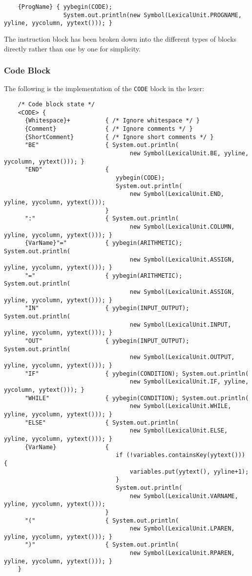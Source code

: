 \documentclass{article}
\begin{document}
	\begin{verbatim}
	{ProgName} { yybegin(CODE);
				 System.out.println(new Symbol(LexicalUnit.PROGNAME, yyline, yycolumn, yytext())); }
	\end{verbatim}

	The instruction block has been broken down into the different types of blocks directly rather than one by one for simplicity.\\

	\subsubsection{Code Block}

	The following is the implementation of the \texttt{CODE} block in the lexer:

	\begin{verbatim}
	/* Code block state */
	<CODE> {
	  {Whitespace}+          { /* Ignore whitespace */ }
	  {Comment}              { /* Ignore comments */ }
	  {ShortComment}         { /* Ignore short comments */ }
	  "BE"                   { System.out.println(
									new Symbol(LexicalUnit.BE, yyline, yycolumn, yytext())); }
	  "END"                  {
								yybegin(CODE);
								System.out.println(
									new Symbol(LexicalUnit.END, yyline, yycolumn, yytext()));
						     }
	  ":"                    { System.out.println(
									new Symbol(LexicalUnit.COLUMN, yyline, yycolumn, yytext())); }
	  {VarName}"="           { yybegin(ARITHMETIC); System.out.println(
									new Symbol(LexicalUnit.ASSIGN, yyline, yycolumn, yytext())); }
	  "="                    { yybegin(ARITHMETIC); System.out.println(
									new Symbol(LexicalUnit.ASSIGN, yyline, yycolumn, yytext())); }
	  "IN"                   { yybegin(INPUT_OUTPUT); System.out.println(
									new Symbol(LexicalUnit.INPUT, yyline, yycolumn, yytext())); }
	  "OUT"                  { yybegin(INPUT_OUTPUT); System.out.println(
									new Symbol(LexicalUnit.OUTPUT, yyline, yycolumn, yytext())); }
	  "IF"                   { yybegin(CONDITION); System.out.println(
									new Symbol(LexicalUnit.IF, yyline, yycolumn, yytext())); }
	  "WHILE"                { yybegin(CONDITION); System.out.println(
									new Symbol(LexicalUnit.WHILE, yyline, yycolumn, yytext())); }
	  "ELSE"                 { System.out.println(
									new Symbol(LexicalUnit.ELSE, yyline, yycolumn, yytext())); }
	  {VarName}              {
								if (!variables.containsKey(yytext())) {
									variables.put(yytext(), yyline+1);
								}
								System.out.println(
									new Symbol(LexicalUnit.VARNAME, yyline, yycolumn, yytext()));
							 }
	  "("                    { System.out.println(
									new Symbol(LexicalUnit.LPAREN, yyline, yycolumn, yytext())); }
	  ")"                    { System.out.println(
									new Symbol(LexicalUnit.RPAREN, yyline, yycolumn, yytext())); }
	}
	\end{verbatim}
\end{document}

